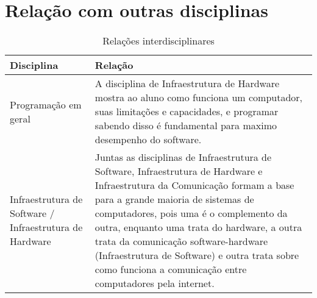 \documentclass[a4paper, 10pt]{article}
\begin{document}
\section{Relação com outras disciplinas}
\begin{table}[h]
\centering
\caption{Relações interdisciplinares}
\label{my-label}
\begin{tabular}{|l|p{8cm}|} \hline

\textbf{Disciplina}                                     & \textbf{Relação}                                                                                                                                                                                                                                                                                                                                                                                                  \\\hline
Programação em geral                                    & A disciplina de Infraestrutura de Hardware mostra ao aluno como funciona um computador, suas limitações e capacidades, e programar sabendo disso é fundamental para maximo desempenho do software.                                                                                                                                                                                                                \\ \hline
Infraestrutura de Software / Infraestrutura de Hardware & Juntas as disciplinas de Infraestrutura de Software, Infraestrutura de Hardware e Infraestrutura da Comunicação formam a base para a grande maioria de sistemas de computadores, pois uma é o complemento da outra, enquanto uma trata do hardware, a outra trata da comunicação software-hardware (Infraestrutura de Software) e outra trata sobre como funciona a comunicação entre computadores pela internet. \\\hline
\end{tabular}
\end{table}

\nocite{dj}
\nocite{ws}


\end{document}
